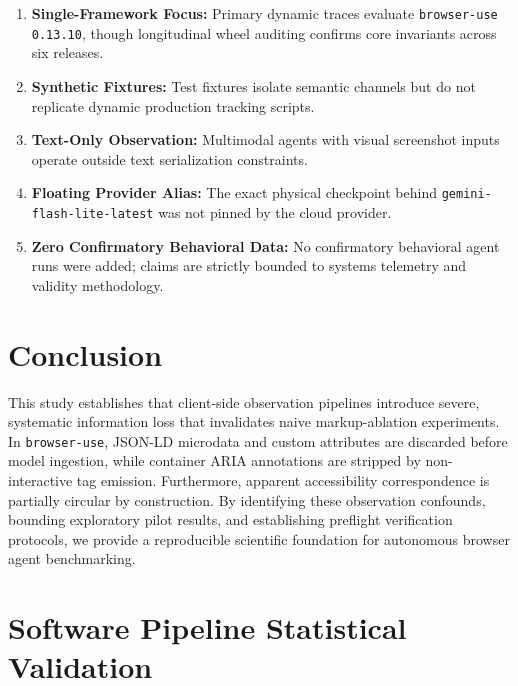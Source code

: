 \documentclass[conference]{IEEEtran}
\begin{document}
\begin{enumerate}
    \item \textbf{Single-Framework Focus:} Primary dynamic traces evaluate \texttt{browser-use 0.13.10}, though longitudinal wheel auditing confirms core invariants across six releases.
    \item \textbf{Synthetic Fixtures:} Test fixtures isolate semantic channels but do not replicate dynamic production tracking scripts.
    \item \textbf{Text-Only Observation:} Multimodal agents with visual screenshot inputs operate outside text serialization constraints.
    \item \textbf{Floating Provider Alias:} The exact physical checkpoint behind \texttt{gemini-flash-lite-latest} was not pinned by the cloud provider.
    \item \textbf{Zero Confirmatory Behavioral Data:} No confirmatory behavioral agent runs were added; claims are strictly bounded to systems telemetry and validity methodology.
\end{enumerate}

\section{Conclusion}
\label{sec:conclusion}

This study establishes that client-side observation pipelines introduce severe, systematic information loss that invalidates naive markup-ablation experiments. In \texttt{browser-use}, JSON-LD microdata and custom attributes are discarded before model ingestion, while container ARIA annotations are stripped by non-interactive tag emission. Furthermore, apparent accessibility correspondence is partially circular by construction. By identifying these observation confounds, bounding exploratory pilot results, and establishing preflight verification protocols, we provide a reproducible scientific foundation for autonomous browser agent benchmarking.




\clearpage
\appendix

\section{Software Pipeline Statistical Validation}
\label{app:benchmark}
\end{document}
